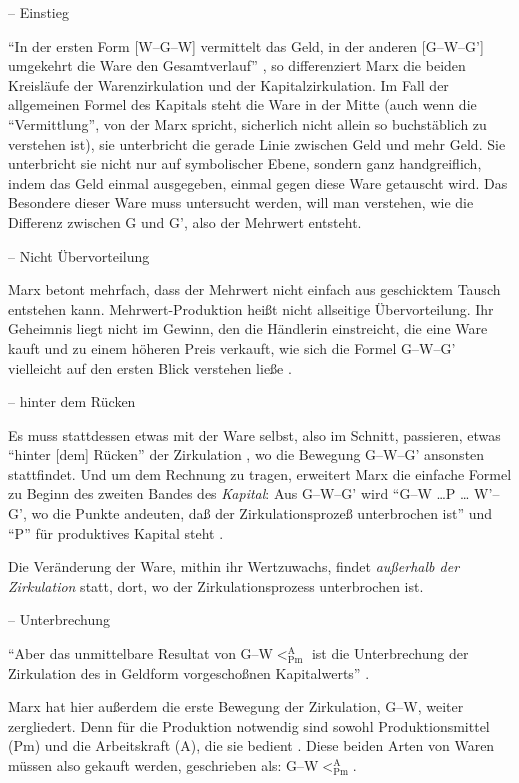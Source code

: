 \documentclass[12pt,
               DIV13,
               paper=a4,
               twoside=false,
               onehalfspacing,
               bibliography=totoc,
               toc=graduated,
               draft,
               ]{scrartcl}
\newcommand{\pc}[2]{\parencite[#1]{#2}}
\newcommand{\vgl}[2]{\parencite[vgl.][#1]{#2}}
\newcommand{\gwg}{G--W--G'\xspace}
\newcommand{\gwapm}{G--W$<^{\text{A}}_{\text{Pm}}$\xspace}
\begin{document}
-- Einstieg

"`In der ersten Form [W--G--W] vermittelt das Geld, in der anderen
[G--W--G'] umgekehrt die Ware den Gesamtverlauf"' \pc{163}{kap}, so
differenziert Marx die beiden Kreisläufe der Warenzirkulation und der
Kapitalzirkulation. Im Fall der allgemeinen Formel des Kapitals steht
die Ware in der Mitte (auch wenn die "`Vermittlung"', von der Marx
spricht, sicherlich nicht allein so buchstäblich zu verstehen ist), sie
unterbricht die gerade Linie zwischen Geld und mehr Geld. Sie
unterbricht sie nicht nur auf symbolischer Ebene, sondern ganz
handgreiflich, indem das Geld einmal ausgegeben, einmal gegen diese
Ware getauscht wird. Das Besondere dieser Ware muss untersucht werden,
will man verstehen, wie die Differenz zwischen G und G', also der
Mehrwert entsteht.

-- Nicht Übervorteilung

Marx betont mehrfach, dass der Mehrwert nicht einfach aus geschicktem
Tausch entstehen kann. Mehrwert-Produktion heißt nicht allseitige
Übervorteilung. Ihr Geheimnis liegt nicht im Gewinn, den die Händlerin
einstreicht, die eine Ware kauft und zu einem höheren Preis verkauft,
wie sich die Formel \gwg vielleicht auf den ersten Blick verstehen
ließe \parencites[vgl.][170-181]{kap}[66]{kap2}.

-- hinter dem Rücken

Es muss stattdessen etwas mit der Ware selbst, also im Schnitt, passieren,
etwas "`hinter [dem] Rücken"' der Zirkulation \pc{181}{kap}, wo die
Bewegung \gwg ansonsten stattfindet. Und um dem
Rechnung zu tragen, erweitert Marx die einfache Formel zu Beginn des
zweiten Bandes des \emph{Kapital}: Aus \gwg wird "`G--W \dots P \dots
W'--G', wo die Punkte andeuten, daß der Zirkulationsprozeß
unterbrochen ist"' \pc{31}{kap2} und "`P"' für produktives Kapital
steht \vgl{34}{kap2}.

Die Veränderung der Ware, mithin ihr Wertzuwachs, findet
\emph{außerhalb der Zirkulation} statt, dort, wo der
Zirkulationsprozess unterbrochen ist.

-- Unterbrechung

"`Aber das unmittelbare Resultat von \gwapm ist die Unterbrechung der
Zirkulation des in Geldform vorgeschoßnen Kapitalwerts"'
\pc{40}{kap2}.

Marx hat hier außerdem die erste Bewegung der Zirkulation, G--W,
weiter zergliedert. Denn für die Produktion notwendig sind sowohl
Produktionsmittel (Pm) und die Arbeitskraft (A), die sie bedient
\vgl{32}{kap2}. Diese beiden Arten von Waren müssen also gekauft
werden, geschrieben als: \gwapm.
\end{document}
